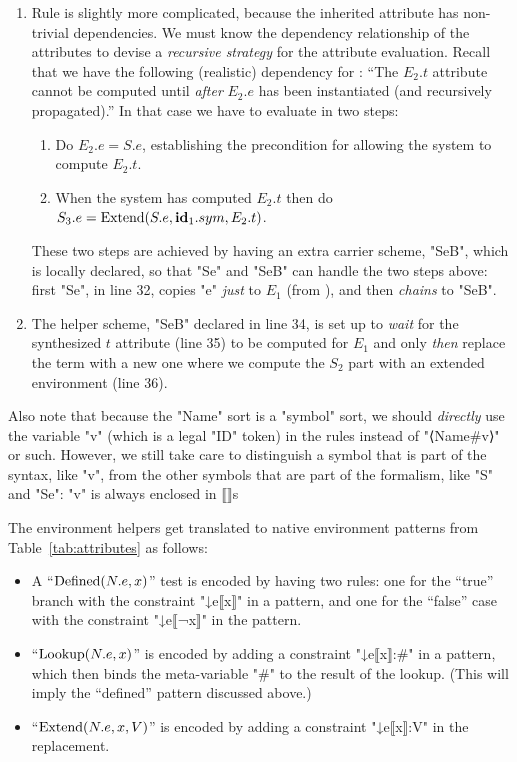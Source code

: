 \documentclass[11pt]{article} %
\begin{document}
\begin{example}
\begin{enumerate}
  \item Rule  is slightly more complicated, because the inherited attribute has
    non-trivial dependencies. We must know the dependency relationship of the attributes to devise a
    \emph{recursive strategy} for the attribute evaluation.  Recall that we have the following
    (realistic) dependency for : ``The $E_2.t$ attribute cannot be computed until
    \emph{after} $E_2.e$ has been instantiated (and recursively propagated).'' In that case we have
    to evaluate  in two steps:
    \begin{enumerate}
    \item Do $E_2.e = S.e$, establishing the precondition for allowing the system to compute $E_2.t$.
    \item When the system has computed $E_2.t$ then do $S_3.e=\operatorname{Extend}(S.e,\textbf{id}_1.sym,E_2.t)$.
    \end{enumerate}
    These two steps are achieved by having an extra carrier scheme, "SeB", which is locally
    declared, so that "Se" and "SeB" can handle the two steps above: first "Se", in line 32, copies
    "e" \emph{just} to $E_1$ (from ), and then \emph{chains} to "SeB".

  \item The helper scheme, "SeB" declared in line 34, is set up to \emph{wait} for the synthesized
    $t$ attribute (line 35) to be computed for $E_1$ and only \emph{then} replace the term with a
    new one where we compute the $S_2$ part with an extended environment (line 36).
    
  \end{enumerate}
  Also note that because the "Name" sort is a "symbol" sort, we should \emph{directly} use the
  variable "v" (which is a legal "ID" token) in the rules instead of "⟨Name#v⟩" or such.  However,
  we still take care to distinguish a symbol that is part of the syntax, like "v", from the other
  symbols that are part of the formalism, like "S" and "Se": "v" is always enclosed in $⟦⟧$s

  The environment helpers get translated to native \HAX environment patterns from
  Table~\ref{tab:attributes} as follows:
  \begin{itemize}

  \item A ``$\operatorname{Defined}(N.e, x)$'' test is encoded by having two rules: one for the ``true''
    branch with the constraint "↓e{⟦x⟧}" in a pattern, and one for the ``false'' case with the
    constraint "↓e{⟦¬x⟧}" in the pattern.

  \item ``$\operatorname{Lookup}(N.e, x)$'' is encoded by adding a constraint "↓e{⟦x⟧:#}" in a pattern, which
    then binds the meta-variable "#" to the result of the lookup. (This will imply the ``defined''
    pattern discussed above.)

  \item ``$\operatorname{Extend}(N.e, x, V)$'' is encoded by adding a constraint "↓e{⟦x⟧:V}" in the
    replacement.

  \end{itemize}
\end{example}
\end{document}
